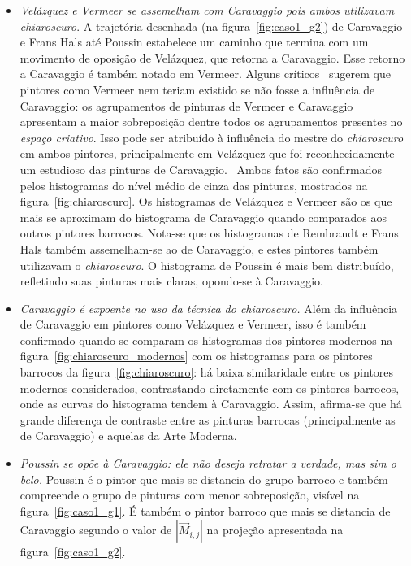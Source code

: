 \begin{itemize}
  \item \textit{Velázquez e Vermeer se assemelham com Caravaggio pois
    ambos utilizavam \textit{chiaroscuro}}. A trajetória desenhada (na
    figura~\ref{fig:caso1_g2}) de Caravaggio e Frans Hals até Poussin
    estabelece um caminho que termina com um movimento de oposição de
    Velázquez, que retorna a Caravaggio. Esse retorno a Caravaggio
    é também notado em Vermeer. Alguns críticos~\cite{lambert} sugerem
    que pintores como Vermeer nem teriam existido se não fosse a
    influência de Caravaggio: os agrupamentos de pinturas de Vermeer e
    Caravaggio apresentam a maior sobreposição dentre todos os
    agrupamentos presentes no \textit{espaço criativo}. Isso pode ser
    atribuído à influência do mestre do \textit{chiaroscuro} em ambos
    pintores, principalmente em Velázquez que foi reconhecidamente
    um estudioso das pinturas de Caravaggio.~\cite{gombrich} Ambos
    fatos são confirmados pelos histogramas do nível médio de cinza
    das pinturas, mostrados na figura~\ref{fig:chiaroscuro}. Os
    histogramas de Velázquez e Vermeer são os que mais se aproximam do
    histograma de Caravaggio quando comparados aos outros pintores
    barrocos. Nota-se que os histogramas de Rembrandt e Frans Hals
    também assemelham-se ao de Caravaggio, e estes pintores também
    utilizavam o \textit{chiaroscuro}. O histograma de Poussin é mais
    bem distribuído, refletindo suas pinturas mais claras, opondo-se à
    Caravaggio.

    \item \textit{Caravaggio é expoente no uso da técnica
      do \textit{chiaroscuro}.} Além da influência de Caravaggio em
      pintores como Velázquez e Vermeer, isso é também confirmado
      quando se comparam os histogramas dos pintores modernos na
      figura~\ref{fig:chiaroscuro_modernos} com os histogramas para os
      pintores barrocos da figura~\ref{fig:chiaroscuro}: há baixa
      similaridade entre os pintores modernos considerados,
      contrastando diretamente com os pintores barrocos, onde as
      curvas do histograma tendem à Caravaggio. Assim, afirma-se que há grande
      diferença de contraste entre as pinturas barrocas
      (principalmente as de Caravaggio) e aquelas da Arte Moderna.

    \item \textit{Poussin se opõe à Caravaggio: ele não deseja
retratar a verdade, mas sim o belo.} Poussin é o pintor que mais se
distancia do grupo barroco e também compreende o grupo de pinturas com
menor sobreposição, visível na figura~\ref{fig:caso1_g1}. É também o
pintor barroco que mais se distancia de Caravaggio segundo o valor de
$|\vec{M}_{i,j}|$ na projeção apresentada na
figura~\ref{fig:caso1_g2}.

\end{itemize}

